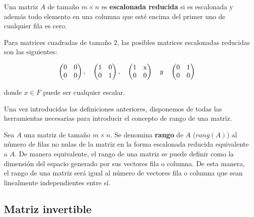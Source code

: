 \begin{definicion}
    Una matriz $A$ de tamaño $m \times n$ es \textbf{escalonada reducida} si es escalonada y además todo elemento en una columna que esté encima del primer uno de cualquier fila es cero.
\end{definicion}

\begin{ejemplo}
    Para matrices cuadradas de tamaño $2$, las posibles matrices escalonadas reducidas son las siguientes:

    \[
        \begin{pmatrix} 0 & 0 \\ 0 & 0 \end{pmatrix}, \quad
        \begin{pmatrix} 1 & 0 \\ 0 & 1 \end{pmatrix}, \quad
        \begin{pmatrix} 1 & $x$ \\ 0 & 0 \end{pmatrix} \quad y \quad
        \begin{pmatrix} 0 & 1 \\ 0 & 0
        \end{pmatrix}
    \]

    donde $x \in F$ puede ser cualquier escalar.\newline
\end{ejemplo}

Una vez introducidas las definiciones anteriores, disponemos de todas las herramientas necesarias para introducir el concepto de rango de una matriz.

\begin{definicion}
    Sea $A$ una matriz de tamaño $m \times n$. Se denomina \textbf{rango} de $A$ ($rang(A)$) al número de filas no nulas de la matriz en la forma escalonada reducida equivalente a $A$. De manera equivalente, el rango de una matriz se puede definir como la dimensión del espacio generado por sus vectores fila o columna. De esta manera, el rango de una matriz será igual al número de vectores fila o columna que sean linealmente independientes entre sí.\newline
\end{definicion}

\subsection{Matriz invertible}\label{subsec:matriz-invertible}

